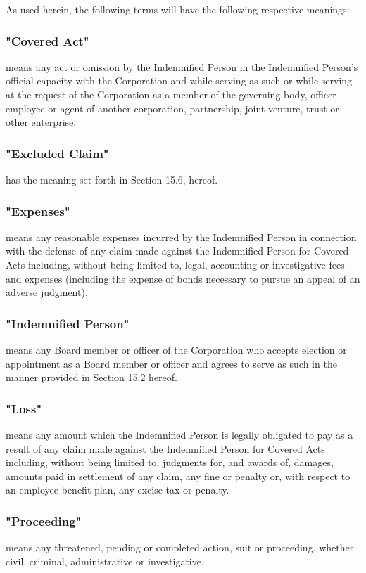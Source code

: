 \documentclass[11pt,american,letterpaper,]{constitution}
\begin{document}
As used herein, the following terms will have the following respective meanings: 
\subsubsection{"Covered Act"}  means any act or omission by the Indemnified Person in the Indemnified Person's official capacity with the Corporation and while serving as such or while serving at the request of the Corporation as a member of the governing body, officer employee or agent of another corporation, partnership, joint venture, trust or other enterprise. 
\subsubsection{"Excluded Claim"} has the meaning set forth in Section 15.6, hereof. 
\subsubsection{"Expenses"} means any reasonable expenses incurred by the Indemnified Person in connection with the defense of any claim made against the Indemnified Person for Covered Acts including, without being limited to, legal, accounting or investigative fees and expenses (including the expense of bonds necessary to pursue an appeal of an adverse judgment). 
\subsubsection{"Indemnified Person"} means any Board member or officer of the Corporation who accepts election or appointment as a Board member or officer and agrees to serve as such in the manner provided in Section 15.2 hereof. 
\subsubsection{"Loss"} means any amount which the Indemnified Person is legally obligated to pay as a result of any claim made against the Indemnified Person for Covered Acts including, without being limited to, judgments for, and awards of, damages, amounts paid in settlement of any claim, any fine or penalty or, with respect to an employee benefit plan, any excise tax or penalty. 
\subsubsection{"Proceeding"} means any threatened, pending or completed action, suit or proceeding, whether civil, criminal, administrative or investigative.
\end{document}

